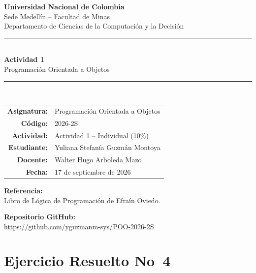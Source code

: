 \documentclass[12pt,a4paper]{article}
\begin{document}
\begin{titlepage}
    \centering
    \vspace*{1.5cm}

    {\LARGE \textbf{Universidad Nacional de Colombia}}\\[0.4cm]
    {\large Sede Medell\'in -- Facultad de Minas}\\[0.2cm]
    {\large Departamento de Ciencias de la Computaci\'on y la Decisi\'on}\\[2cm]

    \rule{\linewidth}{1.5pt}\\[0.4cm]
    {\huge \textbf{Actividad 1}}\\[0.3cm]
    {\Large Programaci\'on Orientada a Objetos}\\[0.3cm]
    \rule{\linewidth}{1.5pt}\\[2cm]

    \begin{tabular}{rl}
        \textbf{Asignatura:}  & Programaci\'on Orientada a Objetos \\[0.3cm]
        \textbf{C\'odigo:}    & 2026-2S \\[0.3cm]
        \textbf{Actividad:}   & Actividad 1 -- Individual (10\%) \\[0.3cm]
        \textbf{Estudiante:}  & Yuliana Stefan\'ia Guzm\'an Montoya \\[0.3cm]
        \textbf{Docente:}     & Walter Hugo Arboleda Mazo \\[0.3cm]
        \textbf{Fecha:}       & 17 de septiembre de 2026 \\[0.3cm]
    \end{tabular}

    \vfill

    {\large \textbf{Referencia:}}\\[0.3cm]
    Libro de L\'ogica de Programaci\'on de Efra\'in Oviedo.

    \vspace{1cm}
    \textbf{Repositorio GitHub:}\\
    \url{https://github.com/yguzmanm-sys/POO-2026-2S}
\end{titlepage}

\tableofcontents
\newpage

\section{Ejercicio Resuelto No~4}
\end{document}
